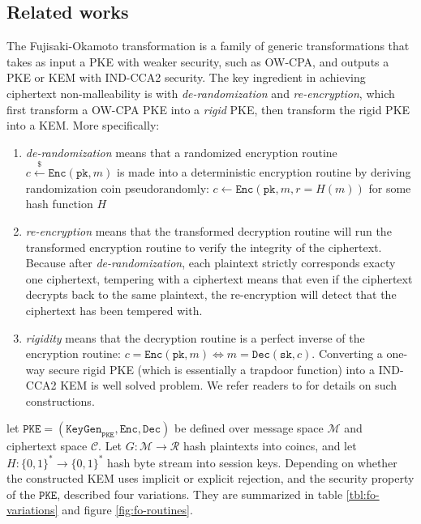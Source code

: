 \documentclass[journal=tches,submission]{iacrtrans}
\newcommand{\pke}{\texttt{PKE}}
\newcommand{\keygen}{\texttt{KeyGen}}
\newcommand{\encrypt}{\texttt{Enc}}
\newcommand{\decrypt}{\texttt{Dec}}
\newcommand{\pk}{\texttt{pk}}
\newcommand{\sk}{\texttt{sk}}
\newcommand{\leftsample}{\stackrel{\$}{\leftarrow}}
\begin{document}
\subsection{Related works}
The Fujisaki-Okamoto transformation \cite{fujisaki1999secure}\cite{hofheinz2017modular} is a family of generic transformations that takes as input a PKE with weaker security, such as OW-CPA, and outputs a PKE or KEM with IND-CCA2 security. The key ingredient in achieving ciphertext non-malleability is with \emph{de-randomization} and \emph{re-encryption}, which first transform a OW-CPA PKE into a \emph{rigid} PKE, then transform the rigid PKE into a KEM. More specifically: \begin{enumerate}
    \item \emph{de-randomization} means that a randomized encryption routine $c \leftsample \encrypt(\pk, m)$ is made into a deterministic encryption routine by deriving randomization coin pseudorandomly: $c \leftarrow \encrypt(\pk, m, r = H(m))$ for some hash function $H$
    \item \emph{re-encryption} means that the transformed decryption routine will run the transformed encryption routine to verify the integrity of the ciphertext. Because after \emph{de-randomization}, each plaintext strictly corresponds exacty one ciphertext, tempering with a ciphertext means that even if the ciphertext decrypts back to the same plaintext, the re-encryption will detect that the ciphertext has been tempered with.
    \item \emph{rigidity} means that the decryption routine is a perfect inverse of the encryption routine: $c = \encrypt(\pk, m) \Leftrightarrow m = \decrypt(\sk, c)$. Converting a one-way secure rigid PKE (which is essentially a trapdoor function) into a IND-CCA2 KEM is well solved problem. We refer readers to \cite{boneh2020graduate} for details on such constructions.
\end{enumerate}

let $\pke = (\keygen_\pke, \encrypt, \decrypt)$ be defined over message space $\mathcal{M}$ and ciphertext space $\mathcal{C}$. Let $G: \mathcal{M} \rightarrow \mathcal{R}$ hash plaintexts into coincs, and let $H: \{0,1\}^\ast \rightarrow \{0,1\}^\ast$ hash byte stream into session keys. Depending on whether the constructed KEM uses implicit or explicit rejection, and the security property of the $\pke$, \cite{hofheinz2017modular} described four variations. They are summarized in table \ref{tbl:fo-variations} and figure \ref{fig:fo-routines}.
\end{document}

